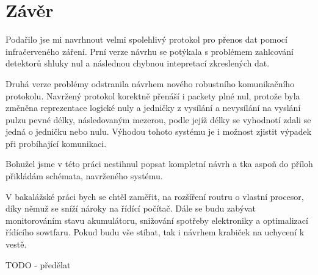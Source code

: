 \chapter{Závěr}

Podařilo jse mi navrhnout velmi spolehlivý protokol pro přenos dat pomocí infračerveného záření. Prní verze návrhu se potýkala s problémem zahlcování detektorů shluky nul a následnou  chybnou intepretací zkreslených dat.

Druhá verze problémy odstranila návrhem nového robustního komunikačního protokolu. Navržený protokol korektně přenáší i packety plné nul, protože byla změněna reprezentace logické nuly a jedničky z vysílání a nevysílání na vyslání pulzu pevné délky, následovaným mezerou, podle jejíž délky se vyhodnotí zdali se jedná o jedničku nebo nulu. Výhodou tohoto systému je i možnost zjistit výpadek při probíhající komunikaci.

Bohužel jsme v této práci nestihnul popsat kompletní návrh a tka aspoň do příloh přikládám schémata, navrženého systému.

V bakalážské práci bych se chtěl zaměřit, na rozšíření routru o vlastní procesor, díky němuž se sníží nároky na řídící počítač. Dále se budu zabývat monitorováním stavu akumulátoru, snižování spotřeby elektroniky a optimalizací řídícího sowtfaru. Pokud budu vše stíhat, tak i návrhem krabiček na uchycení k vestě.

TODO - předělat

